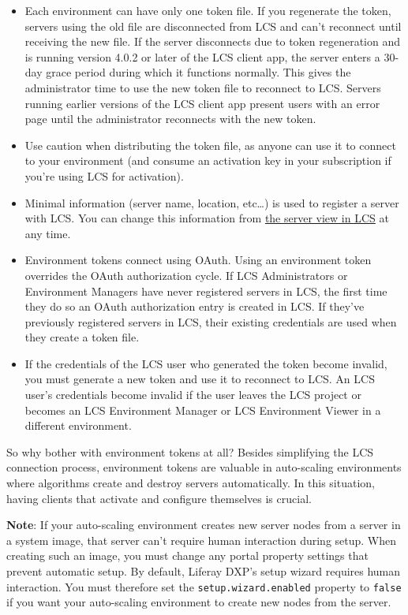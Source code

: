 \begin{itemize}
\item
  Each environment can have only one token file. If you regenerate the
  token, servers using the old file are disconnected from LCS and can't
  reconnect until receiving the new file. If the server disconnects due
  to token regeneration and is running version 4.0.2 or later of the LCS
  client app, the server enters a 30-day grace period during which it
  functions normally. This gives the administrator time to use the new
  token file to reconnect to LCS. Servers running earlier versions of
  the LCS client app present users with an error page until the
  administrator reconnects with the new token.
\item
  Use caution when distributing the token file, as anyone can use it to
  connect to your environment (and consume an activation key in your
  subscription if you're using LCS for activation).
\item
  Minimal information (server name, location, etc\ldots) is used to
  register a server with LCS. You can change this information from
  \hyperref[using-the-server-view]{the server view in LCS} at any time.
\item
  Environment tokens connect using OAuth. Using an environment token
  overrides the OAuth authorization cycle. If LCS Administrators or
  Environment Managers have never registered servers in LCS, the first
  time they do so an OAuth authorization entry is created in LCS. If
  they've previously registered servers in LCS, their existing
  credentials are used when they create a token file.
\item
  If the credentials of the LCS user who generated the token become
  invalid, you must generate a new token and use it to reconnect to LCS.
  An LCS user's credentials become invalid if the user leaves the LCS
  project or becomes an LCS Environment Manager or LCS Environment
  Viewer in a different environment.
\end{itemize}

So why bother with environment tokens at all? Besides simplifying the
LCS connection process, environment tokens are valuable in auto-scaling
environments where algorithms create and destroy servers automatically.
In this situation, having clients that activate and configure themselves
is crucial.

\noindent\hrulefill

\textbf{Note}: If your auto-scaling environment creates new server nodes
from a server in a system image, that server can't require human
interaction during setup. When creating such an image, you must change
any portal property settings that prevent automatic setup. By default,
Liferay DXP's setup wizard requires human interaction. You must
therefore set the \texttt{setup.wizard.enabled} property to
\texttt{false} if you want your auto-scaling environment to create new
nodes from the server.

